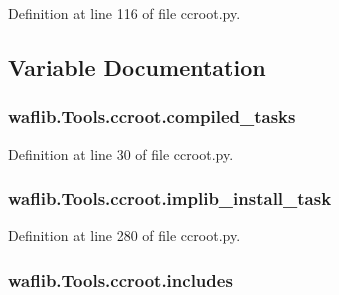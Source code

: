 Definition at line 116 of file ccroot.\+py.



\subsection{Variable Documentation}
\subsubsection[{\texorpdfstring{compiled\+\_\+tasks}{compiled_tasks}}]{\setlength{\rightskip}{0pt plus 5cm}waflib.\+Tools.\+ccroot.\+compiled\+\_\+tasks}\hypertarget{namespacewaflib_1_1_tools_1_1ccroot_aa051551e52d0c141f06bb61cbac4f96a}{}\label{namespacewaflib_1_1_tools_1_1ccroot_aa051551e52d0c141f06bb61cbac4f96a}


Definition at line 30 of file ccroot.\+py.

\subsubsection[{\texorpdfstring{implib\+\_\+install\+\_\+task}{implib_install_task}}]{\setlength{\rightskip}{0pt plus 5cm}waflib.\+Tools.\+ccroot.\+implib\+\_\+install\+\_\+task}\hypertarget{namespacewaflib_1_1_tools_1_1ccroot_a9d8a5a841421e069e4725d12e7e7686b}{}\label{namespacewaflib_1_1_tools_1_1ccroot_a9d8a5a841421e069e4725d12e7e7686b}


Definition at line 280 of file ccroot.\+py.

\subsubsection[{\texorpdfstring{includes}{includes}}]{\setlength{\rightskip}{0pt plus 5cm}waflib.\+Tools.\+ccroot.\+includes}\hypertarget{namespacewaflib_1_1_tools_1_1ccroot_aed36da5a7a1a5b2c9fee82d659088f8e}{}\label{namespacewaflib_1_1_tools_1_1ccroot_aed36da5a7a1a5b2c9fee82d659088f8e}


